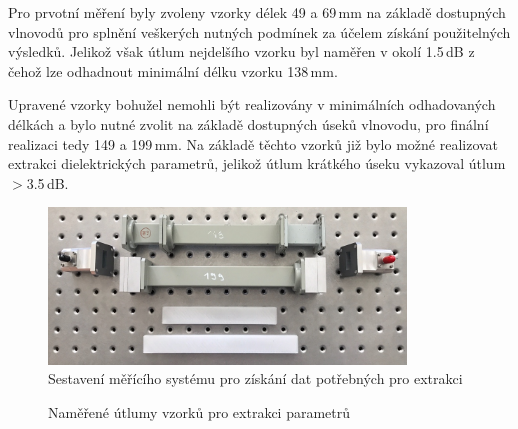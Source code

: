 Pro prvotní měření byly zvoleny vzorky délek 49 a 69\,mm na základě dostupných vlnovodů pro splnění veškerých nutných podmínek za účelem získání použitelných výsledků. Jelikož však útlum nejdelšího vzorku byl naměřen v okolí 1.5\,dB z čehož lze odhadnout minimální délku vzorku 138\,mm. 

Upravené vzorky bohužel nemohli být realizovány v minimálních odhadovaných délkách a bylo nutné zvolit na základě dostupných úseků vlnovodu, pro finální realizaci tedy 149 a 199\,mm. Na základě těchto vzorků již bylo možné realizovat extrakci dielektrických parametrů, jelikož útlum krátkého úseku vykazoval útlum $>$3.5\,dB.

\begin{figure}[!htbp]
\begin{center}
\includegraphics[width=9.5cm]{pics/final/ExtractSetup}
\caption{Sestavení měřícího systému pro získání dat potřebných pro extrakci}
\label{fig:CSTscript}
\end{center}
\end{figure}

\begin{figure}[!htbp]
\label{fig:Attmeasure}
\caption{Naměřené útlumy vzorků pro extrakci parametrů}
\end{figure}


